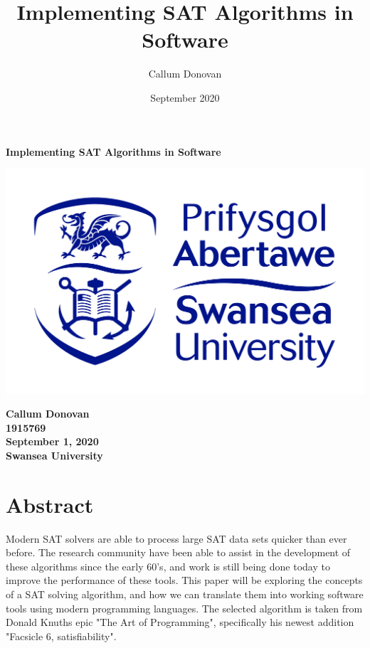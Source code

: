 \documentclass{article}
\title{\bfseries Implementing SAT Algorithms in Software}
\author{Callum Donovan}
\date{September 2020}
\begin{document}
\begin{titlepage}
    \begin{center}
        \Large{\bfseries Implementing SAT Algorithms in Software} \\
        \vspace{4cm}
        \begin{center}
            \includegraphics[scale=0.2]{swan.jpg}
        \end{center}
        \vspace*{\fill}
        \bfseries{\large Callum Donovan \\
            1915769 \\
            September 1, 2020 \\
            Swansea University \\}
    \end{center}
\end{titlepage}

\section{Abstract}
Modern SAT solvers are able to process large SAT data sets quicker than ever before. The research community have been able to assist in the
development of these algorithms since the early 60's, and work is still being done today to improve the performance of these tools. This
paper will be exploring the concepts of a SAT solving algorithm, and how we can translate them into working software tools using modern
programming languages. The selected algorithm is taken from Donald Knuths epic "The Art of Programming", specifically his newest addition "Facsicle 6,
satisfiability". 
\end{document}
